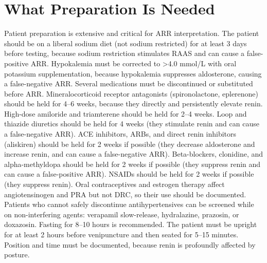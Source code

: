 \section*{What Preparation Is Needed}
Patient preparation is extensive and critical for ARR interpretation. The patient should be on a liberal sodium diet (not sodium restricted) for at least 3 days before testing, because sodium restriction stimulates RAAS and can cause a false-positive ARR. Hypokalemia must be corrected to >4.0 mmol/L with oral potassium supplementation, because hypokalemia suppresses aldosterone, causing a false-negative ARR. Several medications must be discontinued or substituted before ARR. Mineralocorticoid receptor antagonists (spironolactone, eplerenone) should be held for 4--6 weeks, because they directly and persistently elevate renin. High-dose amiloride and triamterene should be held for 2--4 weeks. Loop and thiazide diuretics should be held for 4 weeks (they stimulate renin and can cause a false-negative ARR). ACE inhibitors, ARBs, and direct renin inhibitors (aliskiren) should be held for 2 weeks if possible (they decrease aldosterone and increase renin, and can cause a false-negative ARR). Beta-blockers, clonidine, and alpha-methyldopa should be held for 2 weeks if possible (they suppress renin and can cause a false-positive ARR). NSAIDs should be held for 2 weeks if possible (they suppress renin). Oral contraceptives and estrogen therapy affect angiotensinogen and PRA but not DRC, so their use should be documented. Patients who cannot safely discontinue antihypertensives can be screened while on non-interfering agents: verapamil slow-release, hydralazine, prazosin, or doxazosin. Fasting for 8--10 hours is recommended. The patient must be upright for at least 2 hours before venipuncture and then seated for 5--15 minutes. Position and time must be documented, because renin is profoundly affected by posture.

